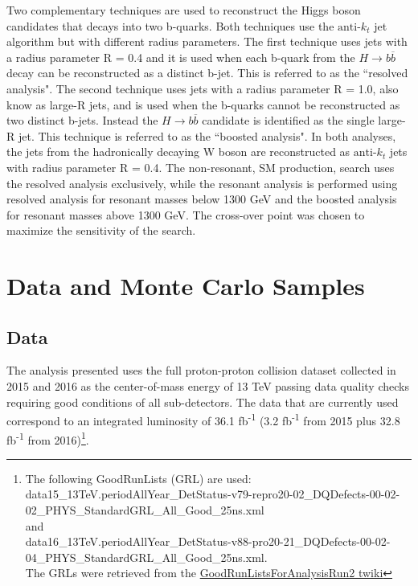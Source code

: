 
Two complementary techniques are used to reconstruct the Higgs boson candidates that decays into two b-quarks. Both techniques use the ${\textrm{anti-}k_{t}}$ jet algorithm but with different radius parameters. The first technique uses jets with a radius parameter R = 0.4 and it is used when each b-quark from the ${H\rightarrow b\overline{b}}$ decay can be reconstructed as a distinct b-jet. This is referred to as the ``resolved analysis"\cite{DiMicco:2151893}. The second technique uses jets with a radius parameter R = 1.0, also know as large-R jets, and is used when the b-quarks cannot be reconstructed as two distinct b-jets. Instead the ${H\rightarrow b\overline{b}}$ candidate is identified as the single large-R jet. This technique is referred to as the ``boosted analysis"\cite{Issever:2276099}. In both analyses, the jets from the hadronically decaying W boson are reconstructed as ${\textrm{anti-}k_{t}}$ jets with radius parameter R = 0.4. The non-resonant, SM production, search uses the resolved analysis exclusively, while the resonant analysis is performed using resolved analysis for resonant masses below 1300 GeV and the boosted analysis for resonant masses above 1300 GeV. The cross-over point was chosen to maximize the sensitivity of the search.
\section{Data and Monte Carlo Samples}
\subsection{Data}
\indent The analysis presented uses the full proton-proton collision dataset collected in 2015 and 2016 as the center-of-mass energy of 13 TeV passing data quality checks requiring good conditions of all sub-detectors. The data that are currently used correspond to an integrated luminosity of 36.1 fb\textsuperscript{-1} (3.2 fb\textsuperscript{-1} from 2015 plus 32.8 fb\textsuperscript{-1} from 2016)\footnote{The following GoodRunLists (GRL) are used:\\  
data15\_13TeV.periodAllYear\_DetStatus-v79-repro20-02\_DQDefects-00-02-02\_PHYS\_StandardGRL\_All\_Good\_25ns.xml\\
and\\
data16\_13TeV.periodAllYear\_DetStatus-v88-pro20-21\_DQDefects-00-02-04\_PHYS\_StandardGRL\_All\_Good\_25ns.xml.\\
The GRLs were retrieved from the \href{https://twiki.cern.ch/twiki/bin/view/AtlasProtected/GoodRunListsForAnalysisRun2}{GoodRunListsForAnalysisRun2 twiki}}.

